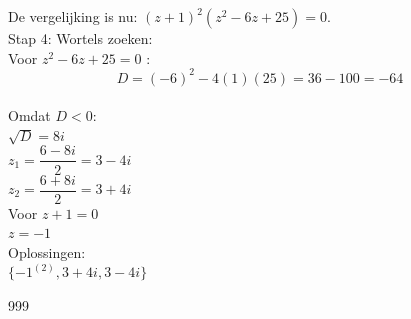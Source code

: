 \documentclass[a4paper]{article}
\begin{document}
De vergelijking is nu: $(z + 1)^2(z^2 - 6z + 25) = 0$.\\

Stap 4: Wortels zoeken:\\

Voor $z^2 - 6z + 25 = 0$ :\\

$$D = (-6)^2 - 4(1)(25) = 36 - 100 = -64$$\\

Omdat $D < 0$:\\

$\sqrt{D}=8i$\\

$z_1 = \dfrac{6 - 8i}{2} = 3 - 4i$\\

$z_2 = \dfrac{6 + 8i}{2} = 3 + 4i$\\

Voor $z+1=0$\\

$z=-1$\\

Oplossingen:\\


$ \{ -1^{(2)}, 3 + 4i, 3 - 4i \}$\\



\begin{thebibliography}{999}
\end{thebibliography}
\end{document}
